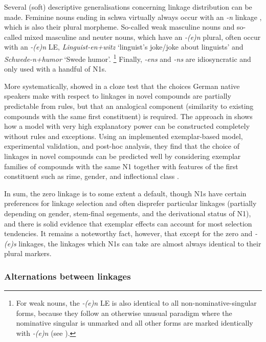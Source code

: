 Several (soft) descriptive generalisations concerning linkage distribution can be made.
Feminine nouns ending in schwa virtually always occur with an \textit{-n} linkage \parencite[32]{LibbenEa2002}, which is also their plural morpheme.
So-called weak masculine nouns and so-called mixed masculine and neuter nouns, which have an \textit{-(e)n} plural, often occur with an \textit{-(e)n} LE, \egg \textit{Linguist-en+witz} `linguist's joke\slash joke about linguists' and \textit{Schwede-n+humor} `Swede humor'.%
\footnote{For weak nouns, the \textit{-(e)n} LE is also identical to all non-nominative-singular forms, because they follow an otherwise unusual paradigm where the nominative singular is unmarked and all other forms are marked identically with \textit{-(e)n} (see \citealt{Koepcke1995,Schaefer2016c}).}
Finally, \textit{-ens} and \textit{-ns} are idiosyncratic and only used with a handful of N1s.

More systematically, \textcite{DresslerEa2001} showed in a cloze test that the choices German native speakers make with respect to linkages in novel compounds are partially predictable from rules, but that an analogical component (similarity to existing compounds with the same first constituent) is required.
The approach in \textcite{KrottEa2007} shows how a model with very high explanatory power can be constructed completely without rules and exceptions.
Using an implemented exemplar-based model, experimental validation, and post-hoc analysis, they find that the choice of linkages in novel compounds can be predicted well by considering exemplar families of compounds with the same N1 together with features of the first constituent such as rime, gender, and inflectional class \parencite[47]{KrottEa2007}.

In sum, the zero linkage is to some extent a default, though N1s have certain preferences for linkage selection and often disprefer particular linkages (partially depending on gender, stem-final segements, and the derivational status of N1), and there is solid evidence that exemplar effects can account for most selection tendencies.
It remains a noteworthy fact, however, that except for the zero and \textit{-(e)s} linkages, the linkages which N1s can take are almost always identical to their plural markers.

\subsubsection{Alternations between linkages}

